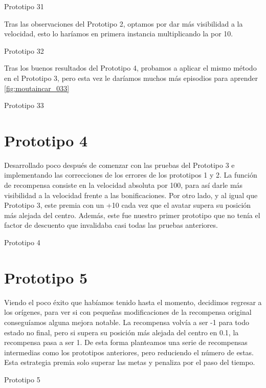 %
{Prototipo 31}

Tras las observaciones del Prototipo 2, optamos por dar más visibilidad a la velocidad, esto lo haríamos en primera instancia multiplicando la por 10.

%
{Prototipo 32}

Tras los buenos resultados del Prototipo 4, probamos a aplicar el mismo método en el Prototipo 3, pero esta vez le daríamos muchos más episodios para aprender \ref{fig:moutaincar_033}

%
{Prototipo 33}

\section{Prototipo 4}
Desarrollado poco después de comenzar con las pruebas del Prototipo 3 e implementando las correcciones de los errores de los prototipos 1 y 2.
La función de recompensa consiste en la velocidad absoluta por 100, para así darle más visibilidad a la velocidad frente a las bonificaciones. Por otro lado, y al igual que Prototipo 3, este premia con un +10 cada vez que el avatar supera su posición más alejada del centro. Además, este fue nuestro primer prototipo que no tenía el factor de descuento que invalidaba casi todas las pruebas anteriores.

%
{Prototipo 4}

\section{Prototipo 5}
Viendo el poco éxito que habíamos tenido hasta el momento, decidimos regresar a los orígenes, para ver si con pequeñas modificaciones de la recompensa original conseguíamos alguna mejora notable.
La recompensa volvía a ser -1 para todo estado no final, pero si supera su posición más alejada del centro en 0.1, la recompensa pasa a ser 1. De esta forma planteamos una serie de recompensas intermedias como los prototipos anteriores, pero reduciendo el número de estas. Esta estrategia premia solo superar las metas y penaliza por el paso del tiempo.

%
{Prototipo 5}

